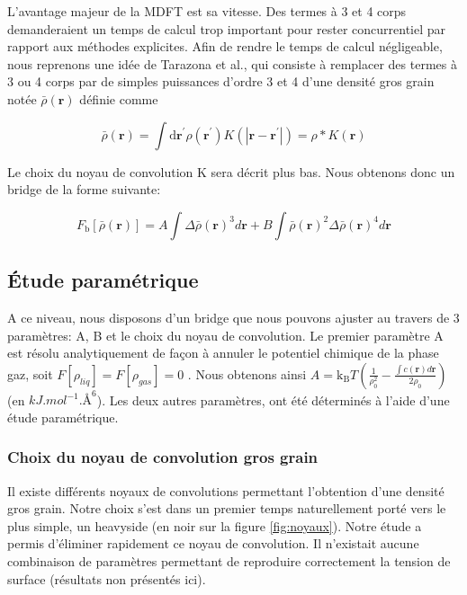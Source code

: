 L'avantage majeur de la MDFT est sa vitesse. Des termes à 3 et 4 corps demanderaient un temps de calcul trop important pour rester concurrentiel par rapport aux méthodes explicites. Afin de rendre le temps de calcul négligeable, nous reprenons une idée de Tarazona et al.\cite{tarazona_free-energy_1985}, qui consiste à remplacer des termes à 3 ou 4 corps par de simples puissances d'ordre 3 et 4 d'une densité gros grain notée $\bar{\rho}(\boldsymbol{r})$ définie comme

\begin{equation} \label{eq:convolution_gros_grain}
\bar{\rho}(\boldsymbol{r}) = \int \mathrm{d}\boldsymbol{r}^\prime \rho(\boldsymbol{r}^\prime) K\left(\left|\boldsymbol{r}-\boldsymbol{r}^\prime\right|\right) = \rho\ast K \left(\boldsymbol{r} \right)
\end{equation}

Le choix du noyau de convolution K sera décrit plus bas. Nous obtenons donc un bridge de la forme suivante:

\begin{equation} \label{eq:fbridge_2}
F_{\mathrm{b}}[\bar{\rho}(\boldsymbol{r})]=A\int\Delta\bar{\rho}(\boldsymbol{r})^3d\boldsymbol{r}+B\int\bar{\rho}(\boldsymbol{r})^2\Delta\bar{\rho}(\boldsymbol{r})^4d\boldsymbol{r}
\end{equation} 


\subsection{\'Etude paramétrique}
A ce niveau, nous disposons d'un bridge que nous pouvons ajuster au travers de 3 paramètres: A, B et le choix du noyau de convolution. Le premier paramètre A est résolu analytiquement de façon à annuler le potentiel chimique de la phase gaz, soit $F[\rho_{liq}]=F[\rho_{gas}]=0$ . Nous obtenons ainsi $A=\mathrm{k_B}T(\frac{1}{\rho_0^2} - \frac{\int c(\boldsymbol{r}) d\boldsymbol{r}}{2\rho_0})$ (en $kJ.mol^{-1}.\text{\AA}^{6}$). Les deux autres paramètres, ont été déterminés à l'aide d'une étude paramétrique.

\subsubsection{Choix du noyau de convolution gros grain}
Il existe différents noyaux de convolutions permettant l'obtention d'une densité gros grain. Notre choix s'est dans un premier temps naturellement porté vers le plus simple, un heavyside (en noir sur la figure \ref{fig:noyaux}). Notre étude a permis d'éliminer rapidement ce noyau de convolution. Il n'existait aucune combinaison de paramètres permettant de reproduire correctement la tension de surface (résultats non présentés ici). 










